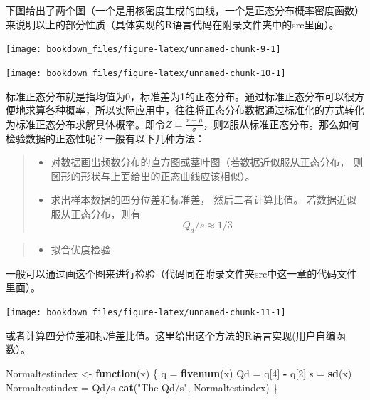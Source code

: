\documentclass[]{ctexbook}
\newenvironment{Shaded}{\begin{snugshade}}{\end{snugshade}}
\newcommand{\ControlFlowTok}[1]{\textcolor[rgb]{0.13,0.29,0.53}{\textbf{#1}}}
\newcommand{\DecValTok}[1]{\textcolor[rgb]{0.00,0.00,0.81}{#1}}
\newcommand{\KeywordTok}[1]{\textcolor[rgb]{0.13,0.29,0.53}{\textbf{#1}}}
\newcommand{\NormalTok}[1]{#1}
\newcommand{\OperatorTok}[1]{\textcolor[rgb]{0.81,0.36,0.00}{\textbf{#1}}}
\newcommand{\StringTok}[1]{\textcolor[rgb]{0.31,0.60,0.02}{#1}}
\providecommand{\tightlist}{%
  \setlength{\itemsep}{0pt}\setlength{\parskip}{0pt}}
\begin{document}
下图给出了两个图（一个是用核密度生成的曲线，一个是正态分布概率密度函数）来说明以上的部分性质（具体实现的R语言代码在附录文件夹中的src里面）。

\texttt{[image: bookdown\_files/figure-latex/unnamed-chunk-9-1]}

\texttt{[image: bookdown\_files/figure-latex/unnamed-chunk-10-1]}

标准正态分布就是指均值为0，标准差为1的正态分布。通过标准正态分布可以很方便地求算各种概率，所以实际应用中，往往将正态分布数据通过标准化的方式转化为标准正态分布求解具体概率。即令\(Z=\frac{x-\mu}{\sigma}\)，则Z服从标准正态分布。那么如何检验数据的正态性呢？一般有以下几种方法：

\begin{quote}
\begin{itemize}
\tightlist
\item
  对数据画出频数分布的直方图或茎叶图（若数据近似服从正态分布， 则图形的形状与上面给出的正态曲线应该相似）。
\item
  求出样本数据的四分位差和标准差， 然后二者计算比值。 若数据近似服从正态分布，则有
  \[Q_d/s\approx1/3\]
\end{itemize}
\end{quote}

\begin{quote}
\begin{itemize}
\tightlist
\item
  拟合优度检验
\end{itemize}
\end{quote}

一般可以通过画这个图来进行检验（代码同在附录文件夹src中这一章的代码文件里面）。

\texttt{[image: bookdown\_files/figure-latex/unnamed-chunk-11-1]}

或者计算四分位差和标准差比值。这里给出这个方法的R语言实现(用户自编函数）。

\begin{Shaded}
\begin{Highlighting}[]
\NormalTok{Normaltestindex <-}\StringTok{ }\ControlFlowTok{function}\NormalTok{(x) \{ }
\NormalTok{  q =}\StringTok{ }\KeywordTok{fivenum}\NormalTok{(x)}
\NormalTok{  Qd =}\StringTok{ }\NormalTok{q[}\DecValTok{4}\NormalTok{] }\OperatorTok{-}\StringTok{ }\NormalTok{q[}\DecValTok{2}\NormalTok{]}
\NormalTok{  s =}\StringTok{ }\KeywordTok{sd}\NormalTok{(x)}
\NormalTok{  Normaltestindex =}\StringTok{ }\NormalTok{Qd}\OperatorTok{/}\NormalTok{s}
  \KeywordTok{cat}\NormalTok{(}\StringTok{"The Qd/s"}\NormalTok{, Normaltestindex)}
\NormalTok{\}}
\end{Highlighting}
\end{Shaded}
\end{document}
